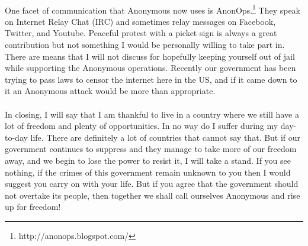 \documentclass{article}
\begin{document}
\paragraph{}
One facet of communication that Anonymous now uses is AnonOps.\footnote{
http://anonops.blogspot.com/}
They speak on Internet Relay Chat (IRC) and sometimes relay messages on 
Facebook, Twitter, and Youtube.  Peaceful protest with a picket sign is always a 
great contribution but not something I would be personally willing to take part 
in. There are means that I will not discuss for hopefully keeping yourself out 
of jail while supporting the Anonymous operations.  Recently our government
has been trying to pass laws to censor the internet here in the US, and if it
came down to it an Anonymous attack would be more than appropriate.  

\paragraph{}
In closing, I will say that I am thankful to live in a country where we still
have a lot of freedom and plenty of opportunities.  In no way do I suffer during
my day-to-day life.  There are definitely a lot of countries that cannot say 
that.  But if our government continues to suppress and they manage to take more
of our freedom away, and we begin to lose the power to resist it, I will take a
stand.   If you see nothing, if the crimes of this government remain unknown to 
you then I would suggest you carry on with your life.  But if you agree that the
government should not overtake its people, then together we shall call ourselves
Anonymous and rise up for freedom!
\end{document}
